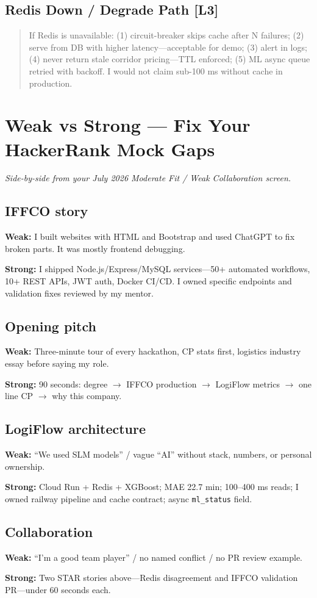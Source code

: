 \documentclass[9pt,a4paper]{article}
\newcommand{\goodans}[1]{\par\noindent\textbf{\textcolor{green!50!black}{Strong:}} #1\par\vspace{1mm}}
\newcommand{\badans}[1]{\par\noindent\textbf{\textcolor{red!70!black}{Weak:}} #1\par\vspace{1mm}}
\newcommand{\diffLthree}{\textcolor{brutal}{\textbf{[L3]}}}
\begin{document}
\subsection{Redis Down / Degrade Path \diffLthree}
\begin{quote}\small
If Redis is unavailable: (1) circuit-breaker skips cache after N failures; (2) serve from DB with higher latency---acceptable for demo; (3) alert in logs; (4) never return stale corridor pricing---TTL enforced; (5) ML async queue retried with backoff. I would not claim sub-100 ms without cache in production.
\end{quote}

\newpage
\section{Weak vs Strong --- Fix Your HackerRank Mock Gaps}
\textit{Side-by-side from your July 2026 Moderate Fit / Weak Collaboration screen.}

\subsection{IFFCO story}
\badans{I built websites with HTML and Bootstrap and used ChatGPT to fix broken parts. It was mostly frontend debugging.}
\goodans{I shipped Node.js/Express/MySQL services---50+ automated workflows, 10+ REST APIs, JWT auth, Docker CI/CD. I owned specific endpoints and validation fixes reviewed by my mentor.}

\subsection{Opening pitch}
\badans{Three-minute tour of every hackathon, CP stats first, logistics industry essay before saying my role.}
\goodans{90 seconds: degree $\rightarrow$ IFFCO production $\rightarrow$ LogiFlow metrics $\rightarrow$ one line CP $\rightarrow$ why this company.}

\subsection{LogiFlow architecture}
\badans{``We used SLM models'' / vague ``AI'' without stack, numbers, or personal ownership.}
\goodans{Cloud Run + Redis + XGBoost; MAE 22.7 min; 100--400 ms reads; I owned railway pipeline and cache contract; async \texttt{ml\_status} field.}

\subsection{Collaboration}
\badans{``I'm a good team player'' / no named conflict / no PR review example.}
\goodans{Two STAR stories above---Redis disagreement and IFFCO validation PR---under 60 seconds each.}
\end{document}
